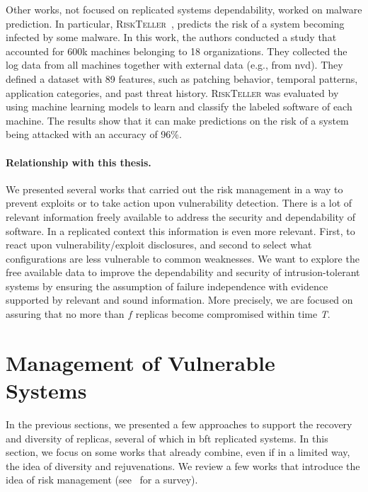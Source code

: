 Other works, not focused on replicated systems dependability, worked on malware prediction. 
In particular, \textsc{RiskTeller}~\cite{Bilge:2017}, predicts the risk of a system becoming infected by some malware.
In this work, the authors conducted a study that accounted for 600k machines belonging to 18 organizations.
They collected the log data from all machines together with external data (e.g., from \gls{nvd}).
They defined a dataset with 89 features, such as patching behavior, temporal patterns, application categories, and past threat history.
\textsc{RiskTeller} was evaluated by using machine learning models to learn and classify the labeled software of each machine.
The results show that it can make predictions on the risk of a system being attacked with an accuracy of 96\%. 


\paragraph{Relationship with this thesis.} 
We presented several works that carried out the risk management in a way to prevent exploits or to take action upon vulnerability detection. 
There is a lot of relevant information freely available to address the security and dependability of software. 
In a replicated context this information is even more relevant. 
First, to react upon vulnerability/exploit disclosures, and second to select what configurations are less vulnerable to common weaknesses. 
We want to explore the free available data to improve the dependability and security of intrusion-tolerant systems by ensuring the assumption of failure independence with evidence supported by relevant and sound information.
More precisely, we are focused on assuring that no more than $f$ replicas become compromised within time \emph{T}.


\section{Management of Vulnerable Systems}
In the previous sections, we presented a few approaches to support the recovery and diversity of replicas, several of which in \gls{bft} replicated systems.
In this section, we focus on some works that already combine, even if in a limited way, the idea of diversity and rejuvenations.
We review a few works that introduce the idea of risk management (see~\cite{Yuan:2014} for a survey).


